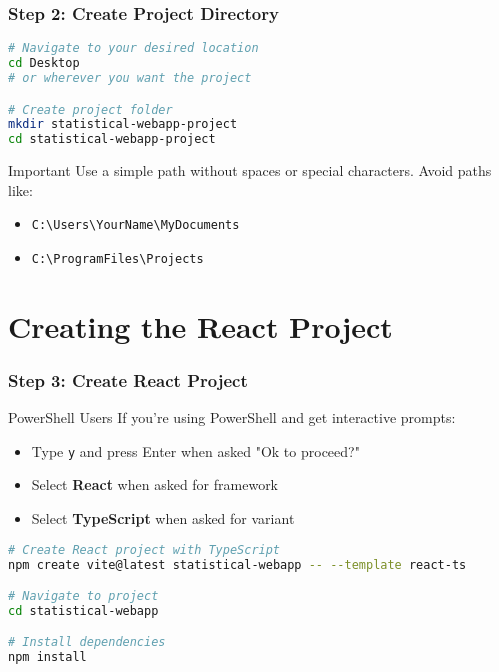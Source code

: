 \documentclass[aspectratio=169]{beamer}
\begin{document}
\begin{frame}[fragile]
\frametitle{Step 2: Create Project Directory}
\begin{lstlisting}[language=bash, caption=Create Project Folder]
# Navigate to your desired location
cd Desktop
# or wherever you want the project

# Create project folder
mkdir statistical-webapp-project
cd statistical-webapp-project
\end{lstlisting}

\begin{alertblock}{Important}
Use a simple path without spaces or special characters. Avoid paths like:
\begin{itemize}
\item \texttt{C:\textbackslash Users\textbackslash YourName\textbackslash MyDocuments}
\item \texttt{C:\textbackslash ProgramFiles\textbackslash Projects}
\end{itemize}
\end{alertblock}
\end{frame}

\section{Creating the React Project}

\begin{frame}[fragile]
\frametitle{Step 3: Create React Project}
\begin{alertblock}{PowerShell Users}
If you're using PowerShell and get interactive prompts:
\begin{itemize}
\item Type \texttt{y} and press Enter when asked "Ok to proceed?"
\item Select \textbf{React} when asked for framework
\item Select \textbf{TypeScript} when asked for variant
\end{itemize}
\end{alertblock}

\begin{lstlisting}[language=bash, caption=Create React App]
# Create React project with TypeScript
npm create vite@latest statistical-webapp -- --template react-ts

# Navigate to project
cd statistical-webapp

# Install dependencies
npm install
\end{lstlisting}
\end{frame}
\end{document}
